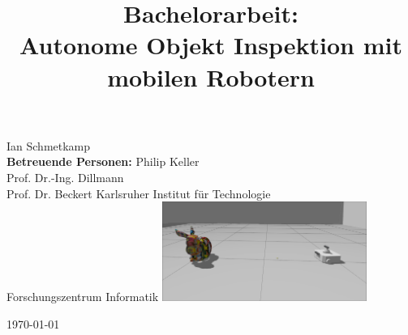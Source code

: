 \documentclass{beamer}
\date{}
\title{\textbf{Bachelorarbeit:} \\ Autonome Objekt Inspektion mit mobilen Robotern }
\begin{document}
\begin{frame}
	\centering
	\maketitle
	\vspace{-2cm}
	Ian Schmetkamp\footnotemark[1] \\ \textbf{Betreuende Personen:} Philip Keller\footnotemark[2] \\ Prof. Dr.-Ing. Dillmann\footnotemark[2] \\ Prof. Dr. Beckert\footnotemark[1]
	\vfill
	\footnotesize{ \footnotemark[1]Karlsruher Institut für Technologie \\  \footnotemark[2]Forschungszentrum Informatik}
	\vfill
	\includegraphics[width=0.5\textwidth]{Graphics/tbandbunny.png}

	\today
\end{frame}
\end{document}

